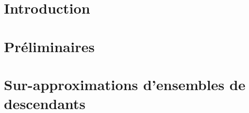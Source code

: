 \documentclass[xcolor={dvipsnames}]{beamer}
\begin{document}
\maketitle

\section{Introduction}


\section{Préliminaires}


\section{Sur-approximations d'ensembles de descendants}
\end{document}
